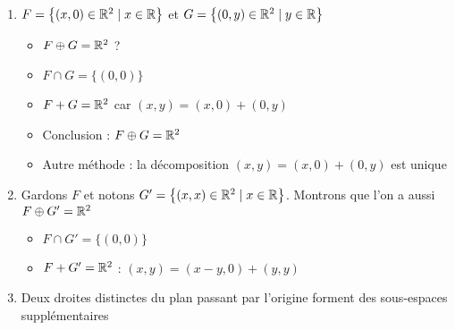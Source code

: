 \begin{frame}
\begin{exemple}
\begin{enumerate}
  \item $F = \big\{ (x,0) \in \mathbb{R}^2 \mid x \in \mathbb{R} \big\}$
et $G = \big\{ (0,y) \in \mathbb{R}^2 \mid y \in \mathbb{R} \big\}$

\hfill\hfill\begin{minipage}{0.3\textwidth}
\end{minipage}
\vspace*{-8ex}
\pause
  \begin{itemize}
    \item $F \oplus G = \mathbb{R}^2$ ?
\pause    
    \item $F\cap G = \{ (0,0) \}$
\pause    
    \item $F+G = \mathbb{R}^2$ car $(x,y)=(x,0)+(0,y)$
\pause    
    \item Conclusion : $F \oplus G = \mathbb{R}^2$
 \pause   
    \item Autre méthode : la décomposition $(x,y)=(x,0)+(0,y)$ est unique
  \end{itemize}


 
\pause

  \item Gardons $F$ et notons $G' = \big\{ (x,x) \in \mathbb{R}^2 \mid x \in \mathbb{R} \big\}$.
Montrons que l'on a aussi $F\oplus G'=\mathbb{R}^2$ 
\pause
  \begin{itemize}
    \item $F \cap G' =\{(0,0)\}$   
\pause    
    \item $F+G' = \mathbb{R}^2$ : $(x,y) = (x-y,0) + (y,y)$
  \end{itemize} 
  
\pause  
  \item Deux droites distinctes du plan 
  passant par l'origine forment des sous-espaces supplémentaires
\end{enumerate}
\end{exemple}
\end{frame}


